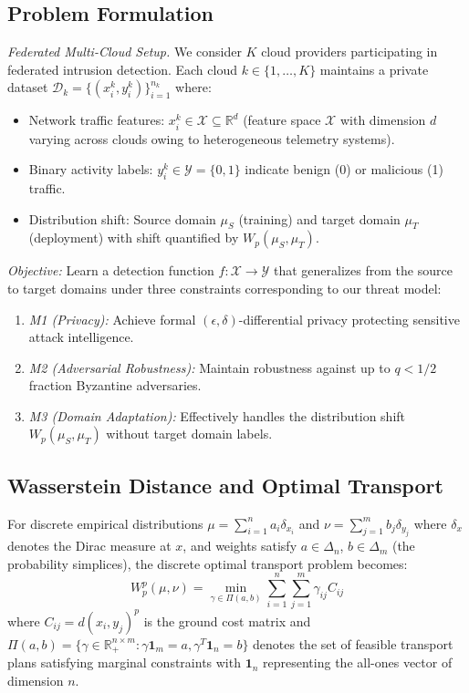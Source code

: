 \documentclass{ieeeaccess}
\theoremstyle{plain}
\theoremstyle{definition}
\theoremstyle{remark}
\begin{document}
\subsection{Problem Formulation}

\textit{Federated Multi-Cloud Setup.} We consider $K$ cloud providers participating in federated intrusion detection. Each cloud $k \in \{1, \ldots, K\}$ maintains a private dataset $\mathcal{D}_k = \{(x_i^k, y_i^k)\}_{i=1}^{n_k}$ where:
\begin{itemize}
\item Network traffic features: $x_i^k \in \mathcal{X} \subseteq \mathbb{R}^d$ (feature space $\mathcal{X}$ with dimension $d$ varying across clouds owing to heterogeneous telemetry systems).
\item Binary activity labels: $y_i^k \in \mathcal{Y} = \{0, 1\}$ indicate benign (0) or malicious (1) traffic.
\item Distribution shift: Source domain $\mu_S$ (training) and target domain $\mu_T$ (deployment) with shift quantified by $W_p(\mu_S, \mu_T)$.
\end{itemize}

\textit{Objective:} Learn a detection function $f: \mathcal{X} \to \mathcal{Y}$ that generalizes from the source to target domains under three constraints corresponding to our threat model:
\begin{enumerate}
\item \textit{M1 (Privacy):} Achieve formal $(\epsilon, \delta)$-differential privacy protecting sensitive attack intelligence.
\item \textit{M2 (Adversarial Robustness):} Maintain robustness against up to $q < 1/2$ fraction Byzantine adversaries.
\item \textit{M3 (Domain Adaptation):} Effectively handles the distribution shift $W_p(\mu_S, \mu_T)$ without target domain labels.
\end{enumerate}

\subsection{Wasserstein Distance and Optimal Transport}

For discrete empirical distributions $\mu = \sum_{i=1}^n a_i \delta_{x_i}$ and $\nu = \sum_{j=1}^m b_j \delta_{y_j}$ where $\delta_x$ denotes the Dirac measure at $x$, and weights satisfy $a \in \Delta_n$, $b \in \Delta_m$ (the probability simplices), the discrete optimal transport problem becomes:
\begin{equation}
W_p^p(\mu, \nu) = \min_{\gamma \in \Pi(a,b)} \sum_{i=1}^n \sum_{j=1}^m \gamma_{ij} C_{ij}
\end{equation}
where $C_{ij} = d(x_i, y_j)^p$ is the ground cost matrix and $\Pi(a, b) = \{\gamma \in \mathbb{R}_+^{n \times m} : \gamma \mathbf{1}_m = a, \gamma^T \mathbf{1}_n = b\}$ denotes the set of feasible transport plans satisfying marginal constraints with $\mathbf{1}_n$ representing the all-ones vector of dimension $n$.
\end{document}
